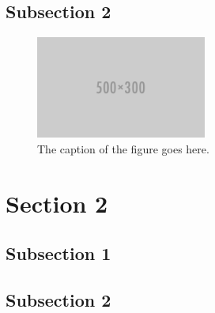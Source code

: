 \subsection{Subsection 2} %
\label{sub:subsection_112}

\lipsum[5-5]

\begin{figure}[h]
\centering
\includegraphics[width=0.5\textwidth]{./img/500X300.png}
\caption{The caption of the figure goes here.}
\label{fig:demo_figure_2}
\end{figure}

\par
\lipsum[6-6]

\section{Section 2} %
\label{sec:section_12}
\lipsum[1-1]

\par
\lipsum[2-2]

\subsection{Subsection 1} %
\label{sub:subsection_121}

\lipsum[3-3]

\par
\lipsum[4-4]

\subsection{Subsection 2} %
\label{sub:subsection_122}

\lipsum[5-5]

\par
\lipsum[6-6]
